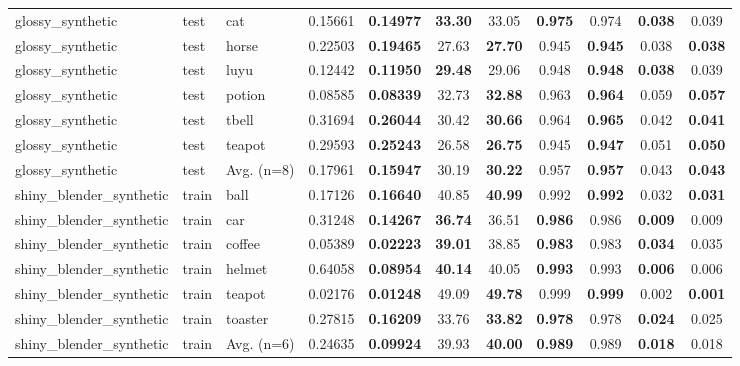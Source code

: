 \begin{table}[t]
{\begin{tabular}{lllcccccccc}
glossy\_synthetic & test & cat & 0.15661 & \textbf{0.14977} & \textbf{33.30} & 33.05 & \textbf{0.975} & 0.974 & \textbf{0.038} & 0.039 \\
glossy\_synthetic & test & horse & 0.22503 & \textbf{0.19465} & 27.63 & \textbf{27.70} & 0.945 & \textbf{0.945} & 0.038 & \textbf{0.038} \\
glossy\_synthetic & test & luyu & 0.12442 & \textbf{0.11950} & \textbf{29.48} & 29.06 & 0.948 & \textbf{0.948} & \textbf{0.038} & 0.039 \\
glossy\_synthetic & test & potion & 0.08585 & \textbf{0.08339} & 32.73 & \textbf{32.88} & 0.963 & \textbf{0.964} & 0.059 & \textbf{0.057} \\
glossy\_synthetic & test & tbell & 0.31694 & \textbf{0.26044} & 30.42 & \textbf{30.66} & 0.964 & \textbf{0.965} & 0.042 & \textbf{0.041} \\
glossy\_synthetic & test & teapot & 0.29593 & \textbf{0.25243} & 26.58 & \textbf{26.75} & 0.945 & \textbf{0.947} & 0.051 & \textbf{0.050} \\
glossy\_synthetic & test & Avg. (n=8) & 0.17961 & \textbf{0.15947} & 30.19 & \textbf{30.22} & 0.957 & \textbf{0.957} & 0.043 & \textbf{0.043} \\
\midrule
shiny\_blender\_synthetic & train & ball & 0.17126 & \textbf{0.16640} & 40.85 & \textbf{40.99} & 0.992 & \textbf{0.992} & 0.032 & \textbf{0.031} \\
shiny\_blender\_synthetic & train & car & 0.31248 & \textbf{0.14267} & \textbf{36.74} & 36.51 & \textbf{0.986} & 0.986 & \textbf{0.009} & 0.009 \\
shiny\_blender\_synthetic & train & coffee & 0.05389 & \textbf{0.02223} & \textbf{39.01} & 38.85 & \textbf{0.983} & 0.983 & \textbf{0.034} & 0.035 \\
shiny\_blender\_synthetic & train & helmet & 0.64058 & \textbf{0.08954} & \textbf{40.14} & 40.05 & \textbf{0.993} & 0.993 & \textbf{0.006} & 0.006 \\
shiny\_blender\_synthetic & train & teapot & 0.02176 & \textbf{0.01248} & 49.09 & \textbf{49.78} & 0.999 & \textbf{0.999} & 0.002 & \textbf{0.001} \\
shiny\_blender\_synthetic & train & toaster & 0.27815 & \textbf{0.16209} & 33.76 & \textbf{33.82} & \textbf{0.978} & 0.978 & \textbf{0.024} & 0.025 \\
shiny\_blender\_synthetic & train & Avg. (n=6) & 0.24635 & \textbf{0.09924} & 39.93 & \textbf{40.00} & \textbf{0.989} & 0.989 & \textbf{0.018} & 0.018 \\

\end{tabular}}
\end{table}
